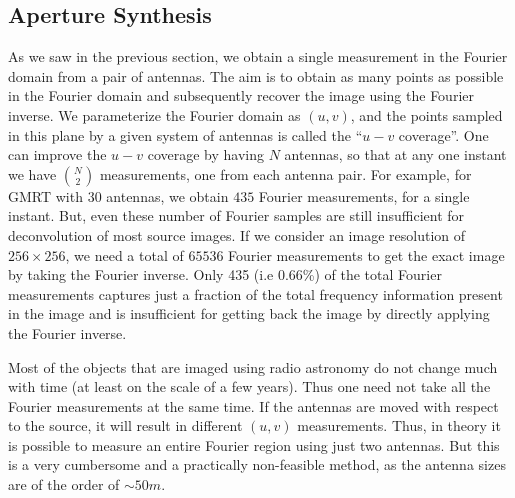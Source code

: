 \subsection{Aperture Synthesis}
\label{sec:apsynth}
As we saw in the previous section, we obtain a single measurement in the Fourier domain from a pair of antennas. The aim is to obtain as many points as possible in the Fourier domain and subsequently recover the image using the Fourier inverse. We parameterize the Fourier domain as $(u,v)$, and the points sampled in this plane by a given system of antennas is called the ``$u-v$ coverage''.
One can improve the $u-v$ coverage by having $N$ antennas, so that at any one instant we have $ N \choose 2$ measurements, one from each antenna pair. For example, for GMRT with $30$ antennas, we obtain $435$ Fourier measurements, for a single instant.
But, even these number of Fourier samples are still insufficient for deconvolution of most  source images. If we consider an image resolution of $256 \times 256$, we need a total of $65536$ Fourier measurements to get the exact image by taking the Fourier inverse. Only 435 (i.e 0.66\%) of the total Fourier measurements captures just a fraction of the total frequency information present in the image and is insufficient for getting back the image by directly applying the Fourier inverse. 

Most of the objects that are imaged using radio astronomy do not change much with time (at least on the scale of a few years). Thus one need not take all the Fourier measurements at the same time. If the antennas are moved with respect to the source, it will result in different $(u,v)$ measurements. Thus, in theory it is possible to measure an entire Fourier region using just two antennas. But this is a very cumbersome and a practically non-feasible method, as the antenna sizes are of the order of $\sim 50m$.

